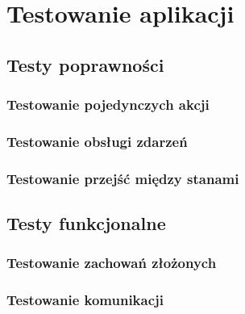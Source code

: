 \chapter{Testowanie aplikacji}
\label{ch:testowanie}

\section{Testy poprawności}

\subsection{Testowanie pojedynczych akcji}

\subsection{Testowanie obsługi zdarzeń}

\subsection{Testowanie przejść między stanami}

\section{Testy funkcjonalne}

\subsection{Testowanie zachowań złożonych}

\subsection{Testowanie komunikacji}
